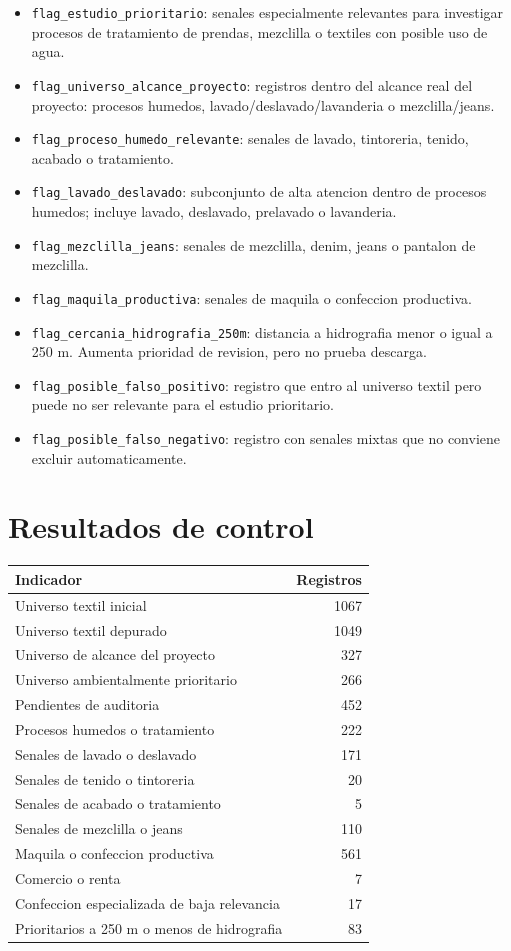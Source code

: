 \documentclass[11pt,letterpaper]{article}
\begin{document}
\begin{itemize}
  \item \texttt{flag\_estudio\_prioritario}: senales especialmente relevantes para investigar procesos de tratamiento de prendas, mezclilla o textiles con posible uso de agua.
  \item \texttt{flag\_universo\_alcance\_proyecto}: registros dentro del alcance real del proyecto: procesos humedos, lavado/deslavado/lavanderia o mezclilla/jeans.
  \item \texttt{flag\_proceso\_humedo\_relevante}: senales de lavado, tintoreria, tenido, acabado o tratamiento.
  \item \texttt{flag\_lavado\_deslavado}: subconjunto de alta atencion dentro de procesos humedos; incluye lavado, deslavado, prelavado o lavanderia.
  \item \texttt{flag\_mezclilla\_jeans}: senales de mezclilla, denim, jeans o pantalon de mezclilla.
  \item \texttt{flag\_maquila\_productiva}: senales de maquila o confeccion productiva.
  \item \texttt{flag\_cercania\_hidrografia\_250m}: distancia a hidrografia menor o igual a 250 m. Aumenta prioridad de revision, pero no prueba descarga.
  \item \texttt{flag\_posible\_falso\_positivo}: registro que entro al universo textil pero puede no ser relevante para el estudio prioritario.
  \item \texttt{flag\_posible\_falso\_negativo}: registro con senales mixtas que no conviene excluir automaticamente.
\end{itemize}

\section{Resultados de control}

\begin{longtable}{lr}
\toprule
Indicador & Registros \\
\midrule
Universo textil inicial & 1067 \\
Universo textil depurado & 1049 \\
Universo de alcance del proyecto & 327 \\
Universo ambientalmente prioritario & 266 \\
Pendientes de auditoria & 452 \\
Procesos humedos o tratamiento & 222 \\
Senales de lavado o deslavado & 171 \\
Senales de tenido o tintoreria & 20 \\
Senales de acabado o tratamiento & 5 \\
Senales de mezclilla o jeans & 110 \\
Maquila o confeccion productiva & 561 \\
Comercio o renta & 7 \\
Confeccion especializada de baja relevancia & 17 \\
Prioritarios a 250 m o menos de hidrografia & 83 \\
\bottomrule
\end{longtable}
\end{document}
